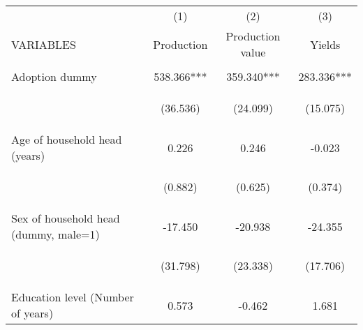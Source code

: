 \begin{center}
\begin{tabular}{lccc} \hline
 & (1) & (2) & (3) \\
VARIABLES & Production & Production value & Yields \\ \hline
\vspace{4pt} & \begin{footnotesize}\end{footnotesize} & \begin{footnotesize}\end{footnotesize} & \begin{footnotesize}\end{footnotesize} \\
Adoption dummy & 538.366*** & 359.340*** & 283.336*** \\
\vspace{4pt} & \begin{footnotesize}(36.536)\end{footnotesize} & \begin{footnotesize}(24.099)\end{footnotesize} & \begin{footnotesize}(15.075)\end{footnotesize} \\
Age of household head (years) & 0.226 & 0.246 & -0.023 \\
\vspace{4pt} & \begin{footnotesize}(0.882)\end{footnotesize} & \begin{footnotesize}(0.625)\end{footnotesize} & \begin{footnotesize}(0.374)\end{footnotesize} \\
Sex of household head (dummy, male=1) & -17.450 & -20.938 & -24.355 \\
\vspace{4pt} & \begin{footnotesize}(31.798)\end{footnotesize} & \begin{footnotesize}(23.338)\end{footnotesize} & \begin{footnotesize}(17.706)\end{footnotesize} \\
Education level (Number of years) & 0.573 & -0.462 & 1.681 \\

\end{tabular}
\end{center}
